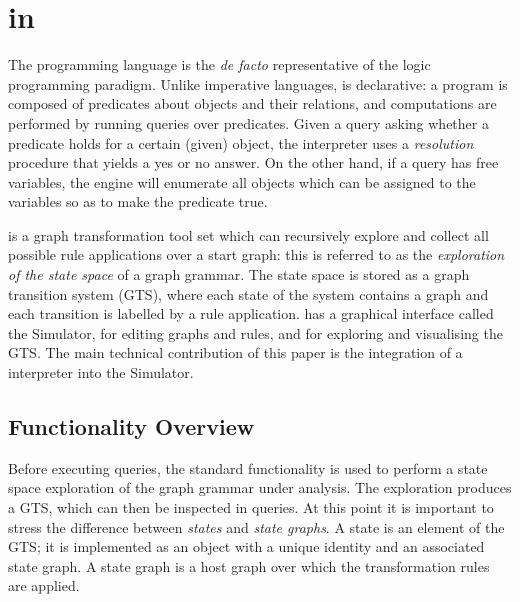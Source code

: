 
\section{\Prolog in \GROOVE}

The \Prolog programming language \cite{Clocksin1984} is the \emph{de facto}
representative of the logic programming paradigm. Unlike imperative languages,
\Prolog is declarative: a \Prolog program is composed of predicates about
objects and their relations, and computations are performed by running queries
over predicates. Given a query asking whether a predicate holds for a certain
(given) object, the \Prolog interpreter uses a \emph{resolution} procedure that
yields a \textsf{yes} or \textsf{no} answer. On the other hand, if a query has
free variables, the \Prolog engine will enumerate all objects which can be
assigned to the variables so as to make the predicate true. 

\GROOVE \cite{GROOVE,STTT} is a graph transformation tool set which can
recursively explore and collect all possible rule applications over a start
graph: this is referred to as the \emph{exploration of the state space} of a
graph grammar. The state space is stored as a graph transition system (GTS),
where each state of the system contains a graph and each transition is labelled
by a rule application. \GROOVE has a graphical interface called the Simulator,
for editing graphs and rules, and for exploring and visualising the GTS. The
main technical contribution of this paper is the integration of a \Prolog
interpreter into the \GROOVE Simulator.


\subsection{Functionality Overview}

Before executing \Prolog queries, the standard \GROOVE functionality is used
to perform a state space exploration of the graph grammar under analysis. The
exploration produces a GTS, which can then be inspected in queries. At this
point it is important to stress the difference between \emph{states} and
\emph{state graphs}. A state is an element of the GTS; it is implemented as an
object with a unique identity and an associated state graph. A state graph is a
host graph over which the transformation rules are applied.

